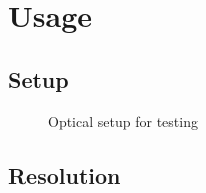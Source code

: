 \section{Usage}

\subsection{Setup}


\begin{figure}[H]
	\centering
	
	\caption{Optical setup for testing}\label{fig:optical_setup}
\end{figure}

\subsection{Resolution}

